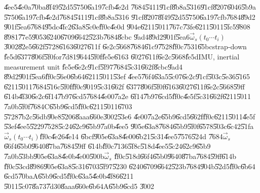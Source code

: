 \documentclass[12pt,a4paper]{article}
\begin{document}
\bigskip

\U{4ee5}\U{4e0a}\U{70ba}\U{8f49}\U{52d5}\U{5750}\U{6a19}\U{7cfb}\U{4e2d}%
\U{7684}\U{5411}\U{91cf}\U{8b8a}\U{5316}\U{91cf}\U{8207}\U{6046}\U{5b9a}%
\U{5750}\U{6a19}\U{7cfb}\U{4e2d}\U{7684}\U{5411}\U{91cf}\U{8b8a}\U{5316}%
\U{91cf}\U{8207}\U{8f49}\U{52d5}\U{5750}\U{6a19}\U{7cfb}\U{7684}\U{89d2}%
\U{901f}\U{5ea6}\U{7684}\U{95dc}\U{4fc2}\U{63a8}\U{5c0e}\U{ff0c}\U{4e0d}%
\U{904e}\U{6211}\U{5011}\U{767c}\U{73fe}\U{6211}\U{5011}\U{5fc5}\U{9808}%
\U{8981}\U{77e5}\U{9053}\U{6240}\U{6709}\U{6642}\U{523b}\U{7684}\U{8cbc}%
\U{9ad4}\U{89d2}\U{901f}\U{5ea6}$\vec{\omega}_{s}\left( t_{0}\cdots
t_{i}\right) $\U{3002}\U{82e5}\U{662f}\U{5728}\U{6163}\U{6027}\U{611f}%
\U{6e2c}\U{5668}\U{7684}\U{61c9}\U{7528}\U{ff0c}\U{7531}\U{65bc}strap-down%
\U{fe5d}\U{6377}\U{806f}\U{5f0f}or\U{7d81}\U{9644}\U{5f0f}\U{fe5e}\U{6163}%
\U{6027}\U{611f}\U{6e2c}\U{5668}\U{fe5d}IMU, inertial measurement unit%
\U{fe5e}\U{6e2c}\U{91cf}\U{5f97}\U{7684}\U{5c31}\U{662f}\U{8cbc}\U{9ad4}%
\U{89d2}\U{901f}\U{5ea6}\U{ff0c}\U{56e0}\U{6b64}\U{6211}\U{5011}\U{53ef}%
\U{4ee5}\U{76f4}\U{63a5}\U{5c07}\U{6e2c}\U{91cf}\U{503c}\U{5e36}\U{5165}%
\U{6211}\U{5011}\U{7684}\U{516c}\U{5f0f}\U{ff0c}\U{9019}\U{5c31}\U{662f}%
\U{6377}\U{806f}\U{5f0f}\U{6163}\U{6027}\U{611f}\U{6e2c}\U{5668}\U{59ff}%
\U{614b}\U{4f30}\U{6e2c}\U{6f14}\U{7b97}\U{6cd5}\U{7684}\U{4e00}\U{7a2e}%
\U{6f14}\U{7b97}\U{6cd5}\U{ff0c}\U{4e5f}\U{5c31}\U{662f}\U{6211}\U{5011}%
\U{7a0b}\U{5f0f}\U{7684}C\U{65b9}\U{6cd5}\U{ff0c}\U{6211}\U{5011}\U{6703}%
\U{5728}\U{7b2c}\U{56db}\U{90e8}\U{5206}\U{8aaa}\U{660e}\U{3002}\U{53e6}%
\U{4e00}\U{7a2e}\U{65b9}\U{6cd5}\U{662f}\U{ff0c}\U{6211}\U{5011}\U{4e5f}%
\U{53ef}\U{4ee5}\U{5229}\U{7528}\U{5c24}\U{62c9}\U{65b9}\U{7a0b}\U{4ee5}%
\U{905e}\U{63a8}\U{7684}\U{65b9}\U{5f0f}\U{6578}\U{503c}\U{6c42}\U{51fa}$%
\vec{\omega}_{s}\left( t_{0}\cdots t_{i}\right) $\U{ff0c}\U{4e26}\U{4e14}%
\U{6bcf}\U{905e}\U{63a8}\U{4e00}\U{6b21}\U{5c31}\U{4ee5}\U{7576}\U{524d}%
\U{7684}$\vec{\omega}_{s}$\U{66f4}\U{65b0}\U{9640}\U{87ba}\U{7684}\U{59ff}%
\U{614b}\U{ff0c}\U{7136}\U{5f8c}\U{518d}\U{4ee5}\U{5c24}\U{62c9}\U{65b9}%
\U{7a0b}\U{53bb}\U{905e}\U{63a8}\U{4e0b}\U{4e00}\U{500b}$\vec{\omega}_{s}$%
\U{ff0c}\U{518d}\U{66f4}\U{65b0}\U{9640}\U{87ba}\U{7684}\U{59ff}\U{614b}%
\U{ff0c}\U{53cd}\U{8986}\U{905e}\U{63a8}\U{5c31}\U{6703}\U{5f97}\U{5230}%
\U{6240}\U{6709}\U{6642}\U{523b}\U{7684}\U{904b}\U{52d5}\U{ff0c}\U{6b64}%
\U{6cd5}\U{70ba}A\U{65b9}\U{6cd5}\U{ff0c}\U{63a5}\U{4e0b}\U{4f86}\U{6211}%
\U{5011}\U{5c07}\U{8a73}\U{7d30}\U{8aaa}\U{660e}\U{6b64}A\U{65b9}\U{6cd5}%
\U{3002}
\end{document}
